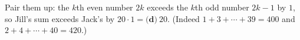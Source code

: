 Pair them up: the $k$th even number $2k$ exceeds the $k$th odd number $2k-1$ by $1$, so Jill's sum exceeds Jack's by $20\cdot1=\boxed{\textbf{(d)}\ 20}$. (Indeed $1+3+\cdots+39=400$ and $2+4+\cdots+40=420$.)

